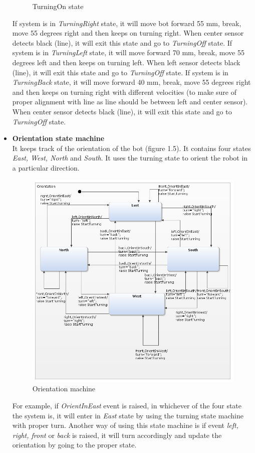 \documentclass[a4paper,12pt,oneside]{book}
\begin{document}
\begin{itemize}
\begin{figure}[!htbp]
	\caption{TurningOn state}
\end{figure}
If system is in \textit{TurningRight} state, it will move bot forward 55 mm, break, move 55 degrees right and then keeps on turning right. When center sensor detects black (line), it will exit this state and go to \textit{TurningOff} state.
If system is in \textit{TurningLeft} state, it will move forward 70 mm, break, move 55 degrees left and then keeps on turning left. When left sensor detects black (line), it will exit this state and go to \textit{TurningOff} state.
If system is in \textit{TurningBack} state, it will move forward 40 mm, break, move 55 degrees right and then keeps on turning right with different velocities (to make sure of proper alignment with line as line should be between left and center sensor). When center sensor detects black (line), it will exit this state and go to \textit{TurningOff} state.

\item \textbf{Orientation state machine}\\
It keeps track of the orientation of the bot (figure 1.5). It contains four states \textit{East, West, North} and \textit{South}. It uses the turning state to orient the robot in a particular direction. 
\begin{figure}[h]
	\centering
	\includegraphics[scale=.6]{orientation.png}
	\caption{Orientation machine}
\end{figure}
For example, if \textit{OrientInEast} event is raised, in whichever of the four state the system is, it will enter in \textit{East} state by using the turning state machine with proper turn. Another way of using this state machine is if event \textit{left, right, front} or \textit{back} is raised, it will turn accordingly and update the orientation by going to the proper state.


\end{itemize}
\end{document}
